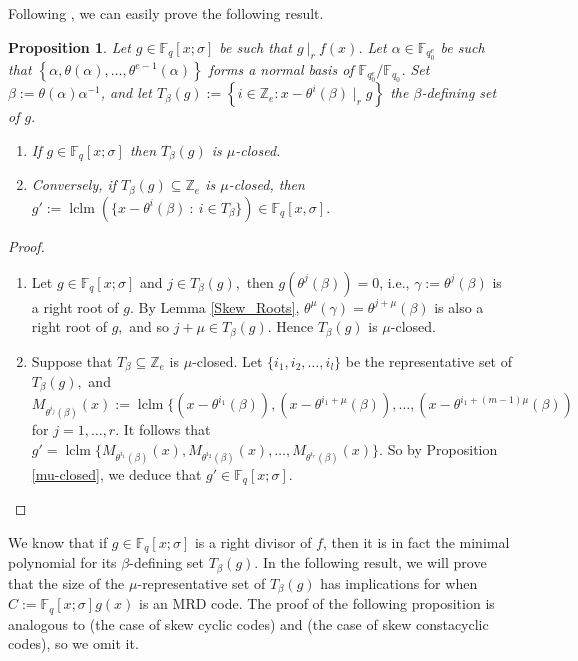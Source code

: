 \documentclass[12pt,paper]{article}
\newcommand{\hlc}[2][yellow]{ {\sethlcolor{#1} \hl{#2}} }
\theoremstyle{plain}
\newtheorem{proposition}[theorem]{Proposition}
\newcommand{\Fq}{\mathbb{F}_{q}}
\DeclareMathOperator{\lclm}{lclm}
\begin{document}
 Following  \cite[Proposition 17]{Alfarano2021}, we can easily prove the following result.

\begin{proposition}
 Let $g \in \mathbb{F}_q[x; \sigma]$ be such that $g ~|_r~ f(x)$. Let $\alpha \in \mathbb{F}_{q_0^e}$ be such that $\left\{ \alpha, \theta(\alpha), \ldots, \theta^{e-1}(\alpha) \right\}$ forms a normal basis of $\mathbb{F}_{q_0^e}/\mathbb{F}_{q_0}$. Set  $\beta := \theta(\alpha) \alpha^{-1}$, and let $ T_\beta(g) := \left\{ i \in \mathbb{Z}_e : x - \theta^i(\beta) \mid_r g \right\}$ the $\beta$-defining set of $g.$
 \begin{enumerate}
     \item If $ g \in \Fq[x;\sigma]$ then $ T_\beta(g) $ is $\mu$-closed.
     \item Conversely, if $ T_{\beta}(g) \subseteq \mathbb Z_e$ is $\mu$-closed, then $ 
    g':= \lclm( \{x-\theta^i(\beta) ~:~ i \in T_{\beta}\}) \in \Fq[x,\sigma].$
 \end{enumerate}
\end{proposition}
\begin{proof}
\begin{enumerate}
     \item  Let $  g \in \Fq[x;\sigma] $ and  $j\in T_\beta(g) ,$  then  $g(\theta^j(\beta))=0$, i.e.,  $ \gamma:=\theta^{j}(\beta)$ is a right root of $g.$  By Lemma \ref{Skew_Roots},  $ \theta^{\mu}(\gamma)=\theta^{j+\mu}(\beta) $   is also a right root of $g,$ and so $ j+\mu \in  T_{\beta}(g). $   Hence  $ T_\beta(g) $ is $\mu$-closed.
     \item Suppose that  $ T_{\beta} \subseteq \mathbb Z_e$  is $\mu$-closed.   Let $ \{i_1,i_2,\ldots, i_l\}$  be  the representative set of $T_{\beta}(g),$ and $ M_{\theta^{i_j}(\beta)}(x):= \lclm\{(x-\theta^{i_1}(\beta)), (x-\theta^{i_1+\mu}(\beta)),\ldots, (x-\theta^{i_1+(m-1)\mu}(\beta))$ for $ j=1,\ldots,r.$ It follows that $g'=\lclm\{ M_{\theta^{i_1}(\beta)}(x), M_{\theta^{i_2}(\beta)}(x),\ldots, M_{\theta^{i_r}(\beta)}(x) \}. $ So by Proposition \ref{mu-closed},  we deduce that $g'\in\Fq[x;\sigma].$  
 \end{enumerate}
\end{proof}

We know that if $g \in \mathbb{F}_{q}[x ; \sigma]$ is a right  divisor of $f$,  then it is in fact the minimal polynomial for its $\beta$-defining set $T_{\beta}(g)$. In the following result, we will prove that the size of the $\mu$-representative set of $T_{\beta}(g)$ has implications for when  $ C := \mathbb{F}_q[x;\sigma] g(x) $  is an MRD code. The proof of the following proposition is analogous to \cite[Proposition 26]{Alfarano2021} (the case of skew cyclic codes) and \cite[Proposition 5.2.4]{Cathryn2024} (the case of skew constacyclic codes), so we omit it.
\end{document}
